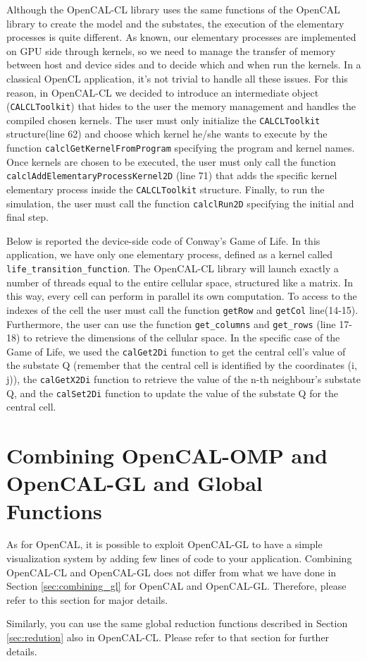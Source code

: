 Although the OpenCAL-CL library uses the same functions of the OpenCAL
library to create the model and the substates, the execution of the
elementary processes is quite different. As known, our elementary
processes are implemented on GPU side through kernels, so we need to
manage the transfer of memory between host and device sides and to
decide which and when run the kernels. In a classical OpenCL
application, it's not trivial to handle all these issues. For this
reason, in OpenCAL-CL we decided to introduce an intermediate object
(\verb'CALCLToolkit') that hides to the user the memory management and
handles the compiled chosen kernels. The user must only initialize the
\verb'CALCLToolkit' structure(line 62) and choose which kernel he/she
wants to execute by the function \verb'calclGetKernelFromProgram'
specifying the program and kernel names. Once kernels are chosen to be
executed, the user must only call the function
\verb'calclAddElementaryProcessKernel2D' (line 71) that adds the
specific kernel elementary process inside the \verb'CALCLToolkit'
structure. Finally, to run the simulation, the user must call the
function \verb'calclRun2D' specifying the initial and final step.

Below is reported the device-side code of Conway's Game of Life.  In
this application, we have only one elementary process, defined as a
kernel called \verb'life_transition_function'. The OpenCAL-CL library
will launch exactly a number of threads equal to the entire cellular
space, structured like a matrix. In this way, every cell can perform
in parallel its own computation. To access to the indexes of the cell
the user must call the function \verb'getRow' and \verb'getCol'
line(14-15). Furthermore, the user can use the function
\verb'get_columns' and \verb'get_rows' (line 17-18) to retrieve the
dimensions of the cellular space.  In the specific case of the Game of
Life, we used the \verb'calGet2Di' function to get the central cell’s
value of the substate Q (remember that the central cell is identified
by the coordinates (i, j)), the \verb'calGetX2Di' function to retrieve
the value of the n-th neighbour’s substate Q, and the \verb'calSet2Di'
function to update the value of the substate Q for the central cell.




\section{Combining OpenCAL-OMP and OpenCAL-GL and  Global Functions}

As for OpenCAL, it is possible to exploit OpenCAL-GL to have a simple
visualization system by adding few lines of code to your
application. Combining OpenCAL-CL and OpenCAL-GL does not differ from
what we have done in Section \ref{sec:combining_gl} for OpenCAL and
OpenCAL-GL. Therefore, please refer to this section for major
details.

Similarly, you can use the same global reduction functions
described in Section \ref{sec:redution} also in OpenCAL-CL.  Please
refer to that section for further details.
